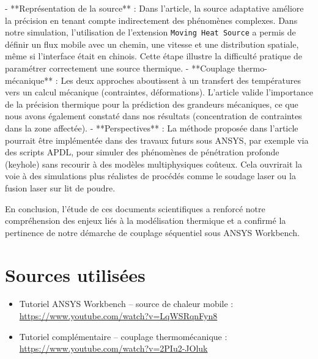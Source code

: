 \documentclass{rapportECL}
\begin{document}
- **Représentation de la source** : Dans l’article, la source adaptative améliore la précision en tenant compte indirectement des phénomènes complexes. Dans notre simulation, l’utilisation de l’extension \texttt{Moving Heat Source} a permis de définir un flux mobile avec un chemin, une vitesse et une distribution spatiale, même si l’interface était en chinois. Cette étape illustre la difficulté pratique de paramétrer correctement une source thermique.
- **Couplage thermo-mécanique** : Les deux approches aboutissent à un transfert des températures vers un calcul mécanique (contraintes, déformations). L’article valide l’importance de la précision thermique pour la prédiction des grandeurs mécaniques, ce que nous avons également constaté dans nos résultats (concentration de contraintes dans la zone affectée).
- **Perspectives** : La méthode proposée dans l’article pourrait être implémentée dans des travaux futurs sous ANSYS, par exemple via des scripts APDL, pour simuler des phénomènes de pénétration profonde (keyhole) sans recourir à des modèles multiphysiques coûteux. Cela ouvrirait la voie à des simulations plus réalistes de procédés comme le soudage laser ou la fusion laser sur lit de poudre.

En conclusion, l’étude de ces documents scientifiques a renforcé notre compréhension des enjeux liés à la modélisation thermique et a confirmé la pertinence de notre démarche de couplage séquentiel sous ANSYS Workbench.

\section{Sources utilisées}

\begin{itemize}
    \item Tutoriel ANSYS Workbench – source de chaleur mobile : \url{https://www.youtube.com/watch?v=LqWSRqnFyn8}
    \item Tutoriel complémentaire – couplage thermomécanique : \url{https://www.youtube.com/watch?v=2PIu2-JOluk}
\end{itemize}
\end{document}
